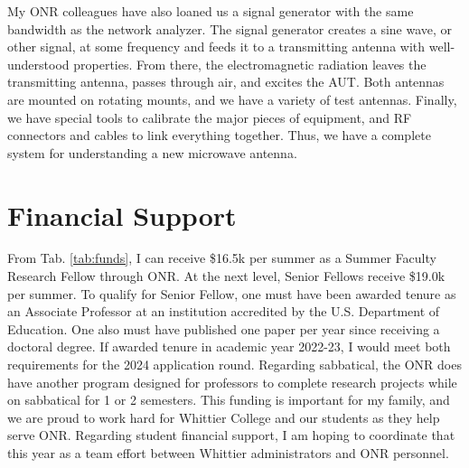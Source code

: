 \documentclass[../../../main.tex]{subfiles}
\begin{document}
My ONR colleagues have also loaned us a signal generator with the same bandwidth as the network analyzer.  The signal generator creates a sine wave, or other signal, at some frequency and feeds it to a transmitting antenna with well-understood properties.  From there, the electromagnetic radiation leaves the transmitting antenna, passes through air, and excites the AUT.  Both antennas are mounted on rotating mounts, and we have a variety of test antennas.  Finally, we have special tools to calibrate the major pieces of equipment, and RF connectors and cables to link everything together.  Thus, we have a complete system for understanding a new microwave antenna.

\section{Financial Support}

From Tab. \ref{tab:funds}, I can receive \$16.5k per summer as a Summer Faculty Research Fellow through ONR.  At the next level, Senior Fellows receive \$19.0k per summer.  To qualify for Senior Fellow, one must have been awarded tenure as an Associate Professor at an institution accredited by the U.S. Department of Education.  One also must have published one paper per year since receiving a doctoral degree.  If awarded tenure in academic year 2022-23, I would meet both requirements for the 2024 application round.  Regarding sabbatical, the ONR does have another program designed for professors to complete research projects while on sabbatical for 1 or 2 semesters.  This funding is important for my family, and we are proud to work hard for Whittier College and our students as they help serve ONR.  Regarding student financial support, I am hoping to coordinate that this year as a team effort between Whittier administrators and ONR personnel.
\end{document}
